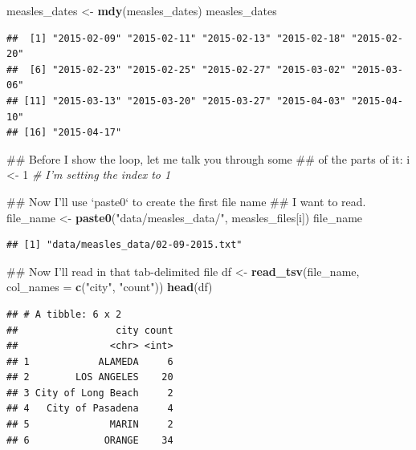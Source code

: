 \documentclass[]{book}
\makeatletter
\newenvironment{Shaded}{\begin{snugshade}}{\end{snugshade}}
\newcommand{\KeywordTok}[1]{\textcolor[rgb]{0.13,0.29,0.53}{\textbf{#1}}}
\newcommand{\DataTypeTok}[1]{\textcolor[rgb]{0.13,0.29,0.53}{#1}}
\newcommand{\DecValTok}[1]{\textcolor[rgb]{0.00,0.00,0.81}{#1}}
\newcommand{\StringTok}[1]{\textcolor[rgb]{0.31,0.60,0.02}{#1}}
\newcommand{\CommentTok}[1]{\textcolor[rgb]{0.56,0.35,0.01}{\textit{#1}}}
\newcommand{\NormalTok}[1]{#1}
\newenvironment{kframe}{%
\medskip{}
\setlength{\fboxsep}{.8em}
 \def\at@end@of@kframe{}%
 \ifinner\ifhmode%
  \def\at@end@of@kframe{\end{minipage}}%
  \begin{minipage}{\columnwidth}%
 \fi\fi%
 \def\FrameCommand##1{\hskip\@totalleftmargin \hskip-\fboxsep
 \colorbox{shadecolor}{##1}\hskip-\fboxsep
     \hskip-\linewidth \hskip-\@totalleftmargin \hskip\columnwidth}%
 \MakeFramed {\advance\hsize-\width
   \@totalleftmargin\z@ \linewidth\hsize
   \@setminipage}}%
 {\par\unskip\endMakeFramed%
 \at@end@of@kframe}
\renewenvironment{Shaded}{\begin{kframe}}{\end{kframe}}
\theoremstyle{definition}
\theoremstyle{definition}
\theoremstyle{definition}
\theoremstyle{remark}
\makeatother
\begin{document}
\begin{Shaded}
\begin{Highlighting}[]
\NormalTok{measles_dates <-}\StringTok{ }\KeywordTok{mdy}\NormalTok{(measles_dates)}
\NormalTok{measles_dates}
\end{Highlighting}
\end{Shaded}

\begin{verbatim}
##  [1] "2015-02-09" "2015-02-11" "2015-02-13" "2015-02-18" "2015-02-20"
##  [6] "2015-02-23" "2015-02-25" "2015-02-27" "2015-03-02" "2015-03-06"
## [11] "2015-03-13" "2015-03-20" "2015-03-27" "2015-04-03" "2015-04-10"
## [16] "2015-04-17"
\end{verbatim}

\begin{Shaded}
\begin{Highlighting}[]
\NormalTok{## Before I show the loop, let me talk you through some }
\NormalTok{## of the parts of it:}
\NormalTok{i <-}\StringTok{ }\DecValTok{1} \CommentTok{# I'm setting the index to 1}

\NormalTok{## Now I'll use `paste0` to create the first file name}
\NormalTok{## I want to read.}
\NormalTok{file_name <-}\StringTok{ }\KeywordTok{paste0}\NormalTok{(}\StringTok{"data/measles_data/"}\NormalTok{, measles_files[i])}
\NormalTok{file_name}
\end{Highlighting}
\end{Shaded}

\begin{verbatim}
## [1] "data/measles_data/02-09-2015.txt"
\end{verbatim}

\begin{Shaded}
\begin{Highlighting}[]
\NormalTok{## Now I'll read in that tab-delimited file}
\NormalTok{df <-}\StringTok{ }\KeywordTok{read_tsv}\NormalTok{(file_name, }\DataTypeTok{col_names =} \KeywordTok{c}\NormalTok{(}\StringTok{"city"}\NormalTok{, }\StringTok{"count"}\NormalTok{))}
\KeywordTok{head}\NormalTok{(df)}
\end{Highlighting}
\end{Shaded}

\begin{verbatim}
## # A tibble: 6 x 2
##                 city count
##                <chr> <int>
## 1            ALAMEDA     6
## 2        LOS ANGELES    20
## 3 City of Long Beach     2
## 4   City of Pasadena     4
## 5              MARIN     2
## 6             ORANGE    34
\end{verbatim}
\end{document}
